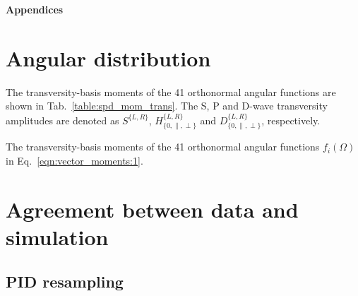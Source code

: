 {\noindent\normalfont\bfseries\Large Appendices}

\appendix

\section{Angular distribution}
\label{sec:appendix:angular-distribution}

The transversity-basis moments of the 41 orthonormal angular functions are shown in Tab.~\ref{table:spd_mom_trans}.  The S, P and D-wave transversity amplitudes are denoted as $S^{\{L,R\}}$, $H^{\{L,R\}}_{\{0,\parallel,\perp\}}$ and $D^{\{L,R\}}_{\{0,\parallel,\perp\}}$, respectively.

\begin{table}[!tb]
\centering
\caption{The transversity-basis moments of the 41 orthonormal angular functions $f_i(\Omega)$ in Eq.~\ref{eqn:vector_moments:1}.}
\label{table:spd_mom_trans}
\resizebox{\textwidth}{!}{

}
\end{table}

\section{Agreement between data and simulation}
\label{sec:appendix:data-mc}

\subsection{PID resampling}
\label{sec:appendix:data-mc:pid}


